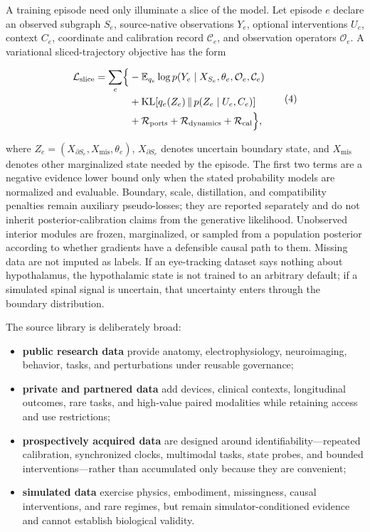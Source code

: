 A training episode need only illuminate a slice of the model. Let episode
\(e\) declare an observed subgraph \(S_e\), source-native observations
\(Y_e\), optional interventions \(U_e\), context \(C_e\), coordinate and
calibration record \(\mathcal C_e\), and observation operators
\(\mathcal O_e\). A variational sliced-trajectory objective has the form

\[
\begin{aligned}
\mathcal L_{\mathrm{slice}}
=\sum_e\Bigl\{&
-\mathbb E_{q_e}\log p(Y_e\mid X_{S_e},\theta_e,
\mathcal O_e,\mathcal C_e)\\
&+\operatorname{KL}\!\left[
q_e(Z_e)\,\|\,p(Z_e\mid U_e,C_e)\right]\\
&+\mathcal R_{\mathrm{ports}}
+\mathcal R_{\mathrm{dynamics}}
+\mathcal R_{\mathrm{cal}}\Bigr\},
\end{aligned}
\tag{4}
\]

where
\(Z_e=(X_{\partial S_e},X_{\mathrm{mis}},\theta_e)\),
\(X_{\partial S_e}\) denotes uncertain boundary state, and
\(X_{\mathrm{mis}}\) denotes other marginalized state needed by the episode.
The first two terms are a negative evidence lower bound only when the stated
probability models are normalized and evaluable. Boundary, scale,
distillation, and compatibility penalties remain auxiliary pseudo-losses; they
are reported separately and do not inherit posterior-calibration claims from
the generative likelihood. Unobserved interior modules are frozen,
marginalized, or sampled from a population
posterior according to whether gradients have a defensible causal path to
them. Missing data are not imputed as labels. If an eye-tracking dataset says
nothing about hypothalamus, the hypothalamic state is not trained to an
arbitrary default; if a simulated spinal signal is uncertain, that
uncertainty enters through the boundary distribution.

The source library is deliberately broad:

\begin{itemize}
\item \textbf{public research data} provide anatomy, electrophysiology,
  neuroimaging, behavior, tasks, and perturbations under reusable governance;
\item \textbf{private and partnered data} add devices, clinical contexts,
  longitudinal outcomes, rare tasks, and high-value paired modalities while
  retaining access and use restrictions;
\item \textbf{prospectively acquired data} are designed around
  identifiability---repeated calibration, synchronized clocks, multimodal
  tasks, state probes, and bounded interventions---rather than accumulated
  only because they are convenient;
\item \textbf{simulated data} exercise physics, embodiment, missingness,
  causal interventions, and rare regimes, but remain simulator-conditioned
  evidence and cannot establish biological validity.
\end{itemize}

